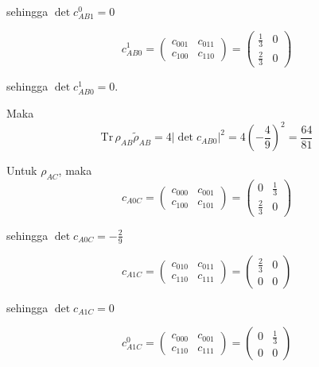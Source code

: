 \begin{enumerate}
	sehingga $\det c_{AB1}^0 = 0$
	
	\begin{equation}
		c_{AB0}^1=
		\begin{pmatrix}
			c_{001} & c_{011} \\
			c_{100} & c_{110}
		\end{pmatrix}=
		\begin{pmatrix}
			\frac{1}{3} & 0 \\
			\frac{2}{3} & 0
		\end{pmatrix}
	\end{equation}
	
	sehingga $\det c_{AB0}^1 = 0$.
	
	Maka
	\begin{equation}
		\mathrm{Tr}\,\rho_{AB}\tilde{\rho}_{AB}=4|\det c_{AB0}|^2=4(-\frac{4}{9})^2=\frac{64}{81}
	\end{equation}
	
	Untuk $\rho_{AC}$, maka
	\begin{equation}
		c_{A0C}=
		\begin{pmatrix}
			c_{000} & c_{001} \\
			c_{100} & c_{101}
		\end{pmatrix}=
		\begin{pmatrix}
			0 & \frac{1}{3} \\
			\frac{2}{3} & 0
		\end{pmatrix}
	\end{equation}
	
	sehingga $\det c_{A0C} = -\frac{2}{9}$
	
	\begin{equation}
		c_{A1C}=
		\begin{pmatrix}
			c_{010} & c_{011} \\
			c_{110} & c_{111}
		\end{pmatrix}=
		\begin{pmatrix}
			\frac{2}{3} & 0 \\
			0 & 0
		\end{pmatrix}
	\end{equation}
	
	sehingga $\det c_{A1C} = 0$
	
	\begin{equation}
		c_{A1C}^0=
		\begin{pmatrix}
			c_{000} & c_{001} \\
			c_{110} & c_{111}
		\end{pmatrix}=
		\begin{pmatrix}
			0 & \frac{1}{3} \\
			0 & 0
		\end{pmatrix}
	\end{equation}
	

\end{enumerate}
